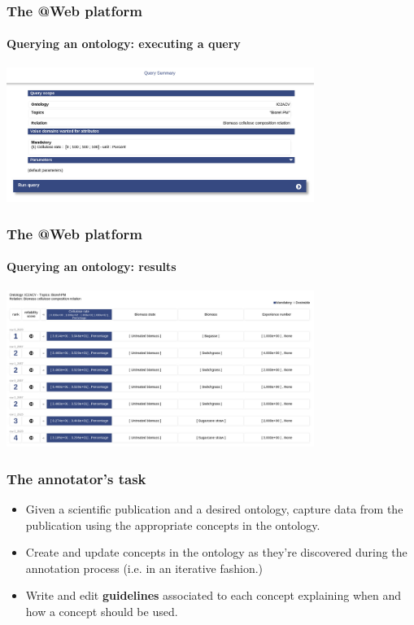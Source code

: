 \documentclass{beamer}
\begin{document}
\begin{frame}
  \frametitle{The \textbf{@Web} platform}
  \framesubtitle{Querying an ontology: executing a query}

  \begin{center}
    \includegraphics[width=10cm]{atweb-query-3.jpg}
  \end{center}
\end{frame}

\begin{frame}
  \frametitle{The \textbf{@Web} platform}
  \framesubtitle{Querying an ontology: results}

  \begin{center}
    \includegraphics[width=10cm]{atweb-query-4.jpg}
  \end{center}
\end{frame}

\begin{frame}
  \frametitle{The annotator's task}

  \begin{itemize}
    \item Given a scientific publication and a desired ontology, capture data
      from the publication using the appropriate concepts in the ontology.

    \pause

    \item Create and update concepts in the ontology as they're discovered
      during the annotation process (i.e. in an iterative fashion.)

    \pause

    \item Write and edit \textbf{guidelines} associated to each concept
      explaining when and how a concept should be used.
  \end{itemize}
\end{frame}
\end{document}
